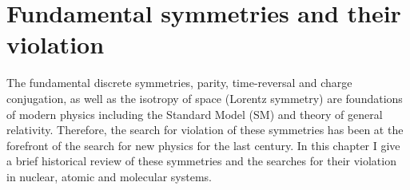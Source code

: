 \documentclass[10pt,a4paper, twoside, openright]{report}
\begin{document}
\linebreak
\chapter{Fundamental symmetries and their violation} \label{chap:Violation}
The fundamental discrete symmetries, parity, time-reversal and charge conjugation, as well as the isotropy of space (Lorentz symmetry) are foundations of modern physics including the Standard Model (SM) and theory of general relativity. Therefore, the search for violation of these symmetries has been at the forefront of the search for new physics for the last century. In this chapter I give a brief historical review of these symmetries and the searches for their violation in nuclear, atomic and molecular systems. 
\end{document}
